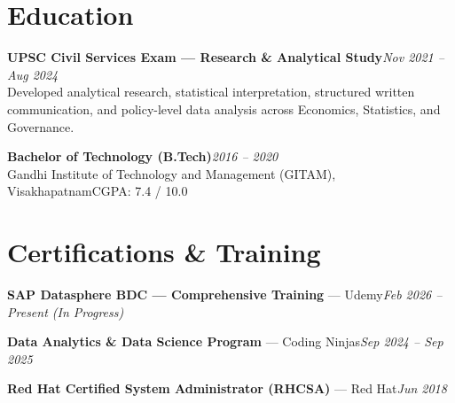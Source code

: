 \documentclass[10pt, letterpaper]{article}
\begin{document}
\section{Education}

{\bfseries UPSC Civil Services Exam — Research \& Analytical Study}\hfill{\small\color{muted}\textit{Nov 2021 – Aug 2024}}\\
{\small\color{muted}Developed analytical research, statistical interpretation, structured written communication, and policy-level data analysis across Economics, Statistics, and Governance.}

\vspace{2pt}
{\bfseries Bachelor of Technology (B.Tech)}\hfill{\small\color{muted}\textit{2016 – 2020}}\\
{\small\color{muted}Gandhi Institute of Technology and Management (GITAM), Visakhapatnam\hfill CGPA: 7.4 / 10.0}

\section{Certifications \& Training}

{\bfseries SAP Datasphere BDC — Comprehensive Training} — Udemy\hfill{\small\color{muted}\textit{Feb 2026 – Present \emph{(In Progress)}}}

\vspace{1pt}
{\bfseries Data Analytics \& Data Science Program} — Coding Ninjas\hfill{\small\color{muted}\textit{Sep 2024 – Sep 2025}}

\vspace{1pt}
{\bfseries Red Hat Certified System Administrator (RHCSA)} — Red Hat\hfill{\small\color{muted}\textit{Jun 2018}}

\end{document}
